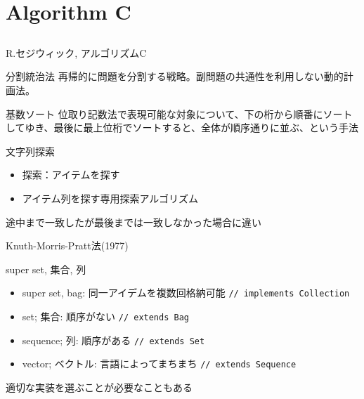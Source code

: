 \documentclass{beamer}
\subtitle{appendix}
\begin{document}
\begin{frame}[fragile]{}
\titlepage
\end{frame}

\section{Algorithm C}		%
\subsection{}

\begin{frame}[fragile]{R.セジウィック, アルゴリズムC}{
\href{https://www.amazon.co.jp/セジウィック-アルゴリズムC-第1-4部-―基礎・データ構造・整列・探索―-ロバート/dp/4764905604/ref=sr_1_2_sspa}{}}

\begin{block}{分割統治法}
再帰的に問題を分割する戦略。副問題の共通性を利用しない動的計画法。
\end{block}

\begin{block}{基数ソート}
位取り記数法で表現可能な対象について、下の桁から順番にソートしてゆき、最後に最上位桁でソートすると、全体が順序通りに並ぶ、という手法
\end{block}
\end{frame}

\begin{frame}[fragile]{文字列探索}{}
\begin{itemize}%
\item 探索：アイテムを探す
\item アイテム列を探す専用探索アルゴリズム
\end{itemize}

\vfill
途中まで一致したが最後までは一致しなかった場合に違い

\vfill
Knuth-Morris-Pratt法(1977)
\end{frame}

\begin{frame}[fragile]{super set, 集合, 列}{}
\begin{itemize}\itemsep8pt
\item super set, bag: 同一アイデムを複数回格納可能 \texttt{// implements Collection}
\item set; 集合: 順序がない \texttt{// extends Bag}
\item sequence; 列: 順序がある \texttt{// extends Set}
\item vector; ベクトル: 言語によってまちまち \texttt{// extends Sequence}
\end{itemize}
\vfill
適切な実装を選ぶことが必要なこともある
\end{frame}
\end{document}
